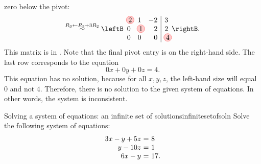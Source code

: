 \begin{solution}
  zero below the pivot:
  \begin{equation*}
  \stackrel{R_3\leftarrow R_3+3R_2}{\sim}
    \leftB
    \begin{array}{rrr|r}
      \circled{2} &  1 &  -2 & 3\\
      0 &  \circled{1} &   2 & 2\\
      0 & 0 & 0 & \circled{4}
    \end{array}
    \rightB.
  \end{equation*}
  This matrix is in {\ef}. Note that the final pivot entry is on the
  right-hand side. The last row corresponds to the equation
  \begin{equation*}
    0x + 0y + 0z = 4.
  \end{equation*}
  This equation has no solution, because for all $x,y,z$, the
  left-hand size will equal $0$ and not $4$. Therefore, there is no
  solution to the given system of equations. In other words, the
  system is inconsistent.
\end{solution}

\begin{example}{Solving a system of equations: an infinite set of solutions}{infinitesetofsoln}
  Solve the following system of equations:
  \begin{equation}
    \begin{array}{r@{~}c@{~}l}
      3x  -y  +5z &=& 8 \\
           y -10z &=& 1 \\
      6x  -y      &=& 17.
    \end{array}
  \end{equation}
\end{example}


